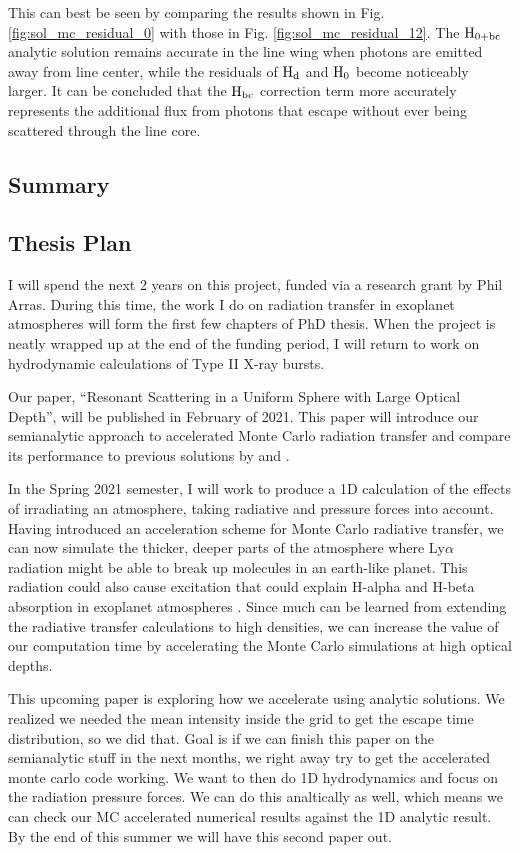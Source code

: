 \documentclass[onecolumn]{aastex63}
\begin{document}
This can best be seen by comparing the results shown in Fig. \ref{fig:sol_mc_residual_0} with those in Fig. \ref{fig:sol_mc_residual_12}. The $\rm H_{0+bc}$ analytic solution remains accurate in the line wing when photons are emitted away from line center, while the residuals of $\rm H_d$ and $\rm H_0$ become noticeably larger. It can be concluded that the $\rm H_{bc}$ correction term more accurately represents the additional flux from photons that escape without ever being scattered through the line core.

\subsection{Summary}

\subsection{Thesis Plan}

I will spend the next 2 years on this project, funded via a research grant by Phil Arras. During this time, the work I do on radiation transfer in exoplanet atmospheres will form the first few chapters of PhD thesis. When the project is neatly wrapped up at the end of the funding period, I will return to work on hydrodynamic calculations of Type II X-ray bursts.

Our paper, ``Resonant Scattering in a Uniform Sphere with Large Optical Depth'', will be published in February of 2021. This paper will introduce our semianalytic approach to accelerated Monte Carlo radiation transfer and compare its performance to previous solutions by \cite{harrington1973} and \cite{2006ApJ...649...14D}. 

In the Spring 2021 semester, I will work to produce a 1D calculation of the effects of irradiating an atmosphere, taking radiative and pressure forces into account. Having introduced an acceleration scheme for Monte Carlo radiative transfer, we can now simulate the thicker, deeper parts of the atmosphere where Ly$\alpha$ radiation might be able to break up molecules in an earth-like planet. This radiation could also cause excitation that could explain H-alpha and H-beta absorption in exoplanet atmospheres \citep{2017ApJ...851..150H}. Since much can be learned from extending the radiative transfer calculations to high densities, we can increase the value of our computation time by accelerating the Monte Carlo simulations at high optical depths.

This upcoming paper is exploring how we accelerate using analytic solutions. We realized we needed the mean intensity inside the grid to get the escape time distribution, so we did that. Goal is if we can finish this paper on the semianalytic stuff in the next months, we right away try to get the accelerated monte carlo code working. We want to then do 1D hydrodynamics and focus on the radiation pressure forces. We can do this analtically as well, which means we can check our MC accelerated numerical results against the 1D analytic result. By the end of this summer we will have this second paper out. 
\end{document}
